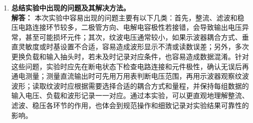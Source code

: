 ﻿\documentclass[10.5pt]{config}
\begin{document}
\begin{enumerate}[label=\arabic*., leftmargin=2em]
    \item \textbf{总结实验中出现的问题及其解决方法。}
    \\ \textbf{解答：}
    本次实验中容易出现的问题主要有以下几类：首先，整流、滤波和稳压电路连接环节较多，二极管方向、电解电容极性若接错，会导致输出电压异常，甚至可能损坏元件；其次，纹波电压通常较小，如果示波器耦合方式、垂直灵敏度或时基设置不合适，容易造成波形显示不清或读数误差；另外，多次更换负载和输入抽头时，若未及时记录对应条件，也容易造成数据混淆。针对这些问题，实验时应先在断电状态下检查电路连接和元件极性，确认无误后再通电测量；测量直流输出时可先用万用表判断电压范围，再用示波器观察纹波波形；读取纹波时应根据需要选择合适的耦合方式和量程，并保持每组数据的输入电压、负载和波形记录一一对应。通过本实验，可以更直观地理解整流、滤波、稳压各环节的作用，也体会到规范操作和细致记录对实验结果可靠性的影响。
\end{enumerate}
\end{document}
